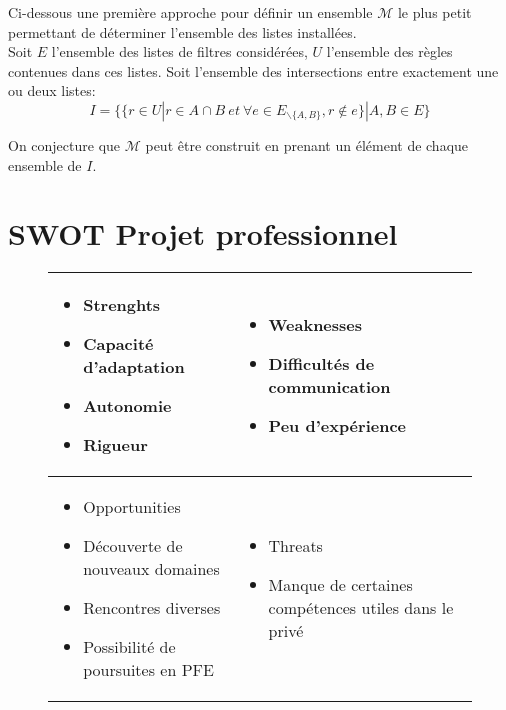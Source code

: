 \documentclass[oneside,a4paper,12pt]{article}
\begin{document}
Ci-dessous une première approche pour définir un ensemble $\mathcal{M}$ le plus petit permettant de déterminer l'ensemble des listes installées.\\

Soit $E$ l'ensemble des listes de filtres considérées, $U$ l'ensemble des règles contenues dans ces listes.
Soit l'ensemble des intersections entre exactement une ou deux listes:
\[I = \{\{r \in U | r \in A \cap B\ et\ \forall e \in E_{\backslash \{A, B\}}, r \notin e\} | A, B \in E\}\]

On conjecture que $\mathcal{M}$ peut être construit en prenant un élément de chaque ensemble de $I$.

\newpage

\section{SWOT Projet professionnel}

\begin{figure}[h]
	\begin{tabular}{ m{6.5cm} | m{6.5cm} }
		\begin{itemize} 
			\item[] Strenghts
			\item Capacité d'adaptation
			\item Autonomie
			\item Rigueur
		\end{itemize} &
		\begin{itemize}
			\item[] Weaknesses 
			\item Difficultés de communication
			\item Peu d'expérience
		\end{itemize} \\
		\hline
		\begin{itemize}	
			\item[] Opportunities
			\item Découverte de nouveaux domaines
			\item Rencontres diverses
			\item Possibilité de poursuites en PFE 
		\end{itemize} &
		\begin{itemize} 
			\item[] Threats
			\item Manque de certaines compétences utiles dans le privé
		\end{itemize} \\
	\end{tabular}
\end{figure}
\end{document}
